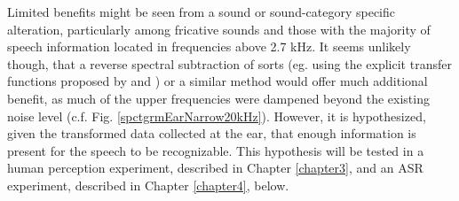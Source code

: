 Limited benefits might be seen from a sound or sound-category specific alteration, particularly among fricative sounds and those with the majority of speech information located in frequencies above 2.7 kHz.  It seems unlikely though, that a reverse spectral subtraction of sorts (eg. using the explicit transfer functions proposed by \cite{hansen:97b} and \cite{reinfeldt:10}) or a similar method would offer much additional benefit, as much of the upper frequencies were dampened beyond the existing noise level (c.f. Fig. \ref{spctgrmEarNarrow20kHz}).  However, it is hypothesized, given the transformed data collected at the ear, that enough information is present for the speech to be recognizable.  This hypothesis will be tested in a human perception experiment, described in Chapter \ref{chapter3}, and an ASR experiment, described in Chapter \ref{chapter4}, below.







